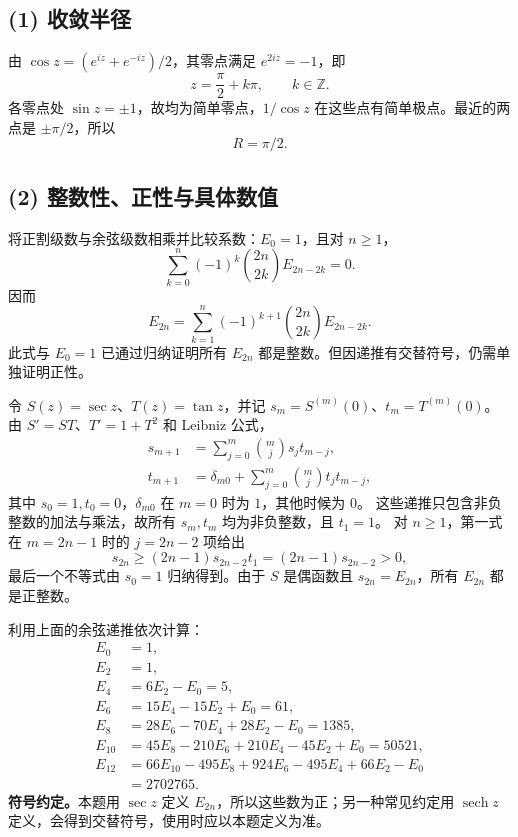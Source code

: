 \documentclass[11pt,a4paper]{ctexart}
\begin{document}
\subsection*{(1) 收敛半径}
由 $\cos z=(e^{iz}+e^{-iz})/2$，其零点满足 $e^{2iz}=-1$，即
\[z=\frac\pi2+k\pi,\qquad k\in\mathbb Z.
\]
各零点处 $\sin z=\pm1$，故均为简单零点，$1/\cos z$ 在这些点有简单极点。最近的两点是 $\pm\pi/2$，所以
\[\boxed{R=\pi/2}.
\]

\subsection*{(2) 整数性、正性与具体数值}
将正割级数与余弦级数相乘并比较系数：$E_0=1$，且对 $n\ge1$，
\[\sum_{k=0}^n(-1)^k\binom{2n}{2k}E_{2n-2k}=0.
\]
因而
\[\boxed{E_{2n}=\sum_{k=1}^n(-1)^{k+1}\binom{2n}{2k}E_{2n-2k}}.
\]
此式与 $E_0=1$ 已通过归纳证明所有 $E_{2n}$ 都是整数。但因递推有交替符号，仍需单独证明正性。

令 $S(z)=\sec z$、$T(z)=\tan z$，并记 $s_m=S^{(m)}(0)$、$t_m=T^{(m)}(0)$。
由 $S'=ST$、$T'=1+T^2$ 和 Leibniz 公式，
\begin{align*}
s_{m+1}&=\sum_{j=0}^m\binom mj s_jt_{m-j},\\
t_{m+1}&=\delta_{m0}+\sum_{j=0}^m\binom mj t_jt_{m-j},
\end{align*}
其中 $s_0=1,t_0=0$，$\delta_{m0}$ 在 $m=0$ 时为 $1$，其他时候为 $0$。
这些递推只包含非负整数的加法与乘法，故所有 $s_m,t_m$ 均为非负整数，且 $t_1=1$。
对 $n\ge1$，第一式在 $m=2n-1$ 时的 $j=2n-2$ 项给出
\[s_{2n}\ge(2n-1)s_{2n-2}t_1=(2n-1)s_{2n-2}>0,
\]
最后一个不等式由 $s_0=1$ 归纳得到。由于 $S$ 是偶函数且 $s_{2n}=E_{2n}$，所有 $E_{2n}$ 都是正整数。

利用上面的余弦递推依次计算：
\begin{align*}
E_0&=1,\\
E_2&=1,\\
E_4&=6E_2-E_0=5,\\
E_6&=15E_4-15E_2+E_0=61,\\
E_8&=28E_6-70E_4+28E_2-E_0=1385,\\
E_{10}&=45E_8-210E_6+210E_4-45E_2+E_0=50521,\\
E_{12}&=66E_{10}-495E_8+924E_6-495E_4+66E_2-E_0\\
&=2702765.
\end{align*}
\textbf{符号约定。}本题用 $\sec z$ 定义 $E_{2n}$，所以这些数为正；另一种常见约定用 $\operatorname{sech}z$ 定义，会得到交替符号，使用时应以本题定义为准。
\end{document}
